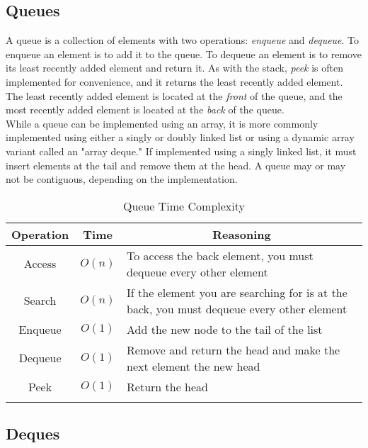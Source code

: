 
\subsection{Queues}

A queue is a collection of elements with  two operations: \textit{enqueue} and \textit{dequeue}. To enqueue an element is to add it to the queue. To dequeue an element is to remove its least recently added element and return it. As with the stack, \textit{peek} is often implemented for convenience, and it returns the least recently added element. The least recently added element is located at the \textit{front} of the queue, and the most recently added element is located at the \textit{back} of the queue. \\

While a queue can be implemented using an array, it is more commonly implemented using either a singly or doubly linked list or using a dynamic array variant called an "array deque." If implemented using a singly linked list, it must insert elements at the tail and remove them at the head. A queue may or may not be contiguous, depending on the implementation.

\begin{table}[H]
	\caption{Queue Time Complexity}
	\label{tab:queue}
	\begin{tabularx}{\textwidth}{|c|c|X|}
		\vtabularspace{3}
		\hline
		Operation & Time & \multicolumn{1}{c|}{Reasoning} \\
		\hline
		Access & $O(n)$ & To access the back element, you must dequeue every other element \\
		Search & $O(n)$ & If the element you are searching for is at the back, you must dequeue every other element  \\
		\hline
		\hline
		Enqueue & $O(1)$ & Add the new node to the tail of the list \\
		Dequeue & $O(1)$ & Remove and return the head and make the next element the new head \\
		Peek & $O(1)$ & Return the head \\
		\hline
		\vtabularspace{3}
	\end{tabularx}
\end{table}


\subsection{Deques}

